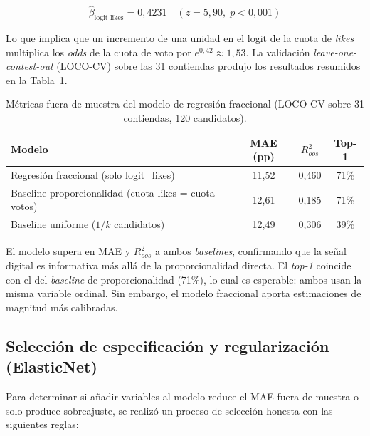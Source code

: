 \begin{equation}
    \hat{\beta}_{\text{logit\_likes}} = 0{,}4231 \quad (z = 5{,}90,\; p < 0{,}001)
\end{equation}

Lo que implica que un incremento de una unidad en el logit de la cuota de \textit{likes} multiplica los \textit{odds} de la cuota de voto por $e^{0{,}42} \approx 1{,}53$. La validación \textit{leave-one-contest-out} (LOCO-CV) sobre las 31 contiendas produjo los resultados resumidos en la Tabla~\ref{tab:colombia_modelo_continuo}.

\begin{table}[htbp]
\centering
\caption{Métricas fuera de muestra del modelo de regresión fraccional (LOCO-CV sobre 31 contiendas, 120 candidatos).}
\label{tab:colombia_modelo_continuo}
\begin{tabular}{l c c c}
\toprule
\textbf{Modelo} & \textbf{MAE (pp)} & \textbf{$R^2_{oos}$} & \textbf{Top-1} \\
\midrule
Regresión fraccional (solo logit\_likes) & 11{,}52 & 0{,}460 & 71\% \\
Baseline proporcionalidad (cuota likes = cuota votos) & 12{,}61 & 0{,}185 & 71\% \\
Baseline uniforme ($1/k$ candidatos) & 12{,}49 & 0{,}306 & 39\% \\
\bottomrule
\end{tabular}
\end{table}

El modelo supera en MAE y $R^2_{oos}$ a ambos \textit{baselines}, confirmando que la señal digital es informativa más allá de la proporcionalidad directa. El \textit{top-1} coincide con el del \textit{baseline} de proporcionalidad (71\%), lo cual es esperable: ambos usan la misma variable ordinal. Sin embargo, el modelo fraccional aporta estimaciones de magnitud más calibradas.

\subsection{Selección de especificación y regularización (ElasticNet)}

Para determinar si añadir variables al modelo reduce el MAE fuera de muestra o solo produce sobreajuste, se realizó un proceso de selección honesta con las siguientes reglas:


